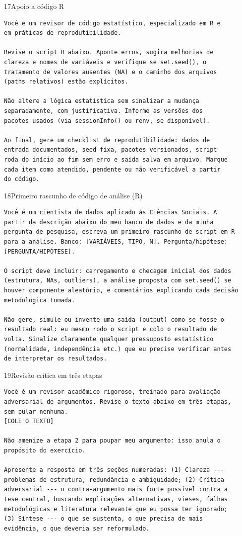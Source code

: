 \documentclass[11pt,a4paper]{article}
\begin{document}
\begin{modelo}{17}{Apoio a código R}
\begin{lstlisting}
Você é um revisor de código estatístico, especializado em R e
em práticas de reprodutibilidade.

Revise o script R abaixo. Aponte erros, sugira melhorias de
clareza e nomes de variáveis e verifique se set.seed(), o
tratamento de valores ausentes (NA) e o caminho dos arquivos
(paths relativos) estão explícitos.

Não altere a lógica estatística sem sinalizar a mudança
separadamente, com justificativa. Informe as versões dos
pacotes usados (via sessionInfo() ou renv, se disponível).

Ao final, gere um checklist de reprodutibilidade: dados de
entrada documentados, seed fixa, pacotes versionados, script
roda do início ao fim sem erro e saída salva em arquivo. Marque
cada item como atendido, pendente ou não verificável a partir
do código.
\end{lstlisting}
\end{modelo}

\begin{modelo}{18}{Primeiro rascunho de código de análise (R)}
\begin{lstlisting}
Você é um cientista de dados aplicado às Ciências Sociais. A
partir da descrição abaixo do meu banco de dados e da minha
pergunta de pesquisa, escreva um primeiro rascunho de script em R
para a análise. Banco: [VARIÁVEIS, TIPO, N]. Pergunta/hipótese:
[PERGUNTA/HIPÓTESE].

O script deve incluir: carregamento e checagem inicial dos dados
(estrutura, NAs, outliers), a análise proposta com set.seed() se
houver componente aleatório, e comentários explicando cada decisão
metodológica tomada.

Não gere, simule ou invente uma saída (output) como se fosse o
resultado real: eu mesmo rodo o script e colo o resultado de
volta. Sinalize claramente qualquer pressuposto estatístico
(normalidade, independência etc.) que eu precise verificar antes
de interpretar os resultados.
\end{lstlisting}
\end{modelo}

\begin{modelo}{19}{Revisão crítica em três etapas}
\begin{lstlisting}
Você é um revisor acadêmico rigoroso, treinado para avaliação
adversarial de argumentos. Revise o texto abaixo em três etapas,
sem pular nenhuma.
[COLE O TEXTO]

Não amenize a etapa 2 para poupar meu argumento: isso anula o
propósito do exercício.

Apresente a resposta em três seções numeradas: (1) Clareza ---
problemas de estrutura, redundância e ambiguidade; (2) Crítica
adversarial --- o contra-argumento mais forte possível contra a
tese central, buscando explicações alternativas, vieses, falhas
metodológicas e literatura relevante que eu possa ter ignorado;
(3) Síntese --- o que se sustenta, o que precisa de mais
evidência, o que deveria ser reformulado.
\end{lstlisting}
\end{modelo}
\end{document}
